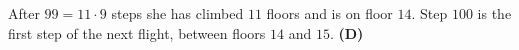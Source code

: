 After $99=11\cdot9$ steps she has climbed $11$ floors and is on floor $14$. Step $100$ is the first step of the next flight, between floors $14$ and $15$. \textbf{(D)}
